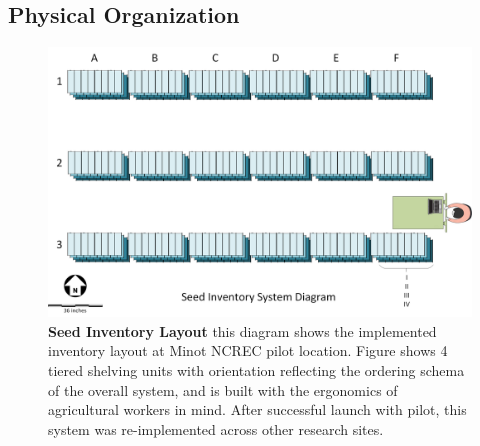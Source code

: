 \documentclass[12pt, letterpaper,oneocolumn]{article}
\begin{document}
	\subsection{Physical Organization}

	\begin{center}
	\begin{figure}[H]
	\includegraphics[width=\linewidth]{SeedInventoryLayout.png}
	\caption{\textbf{Seed Inventory Layout} this diagram shows the implemented inventory layout at Minot NCREC pilot location. Figure shows 4 tiered shelving units with orientation reflecting the ordering schema of the overall system, and is built with the ergonomics of agricultural workers in mind. After successful launch with pilot, this system was re-implemented across other research sites.}
		\end{figure}
\end{center}
\end{document}
